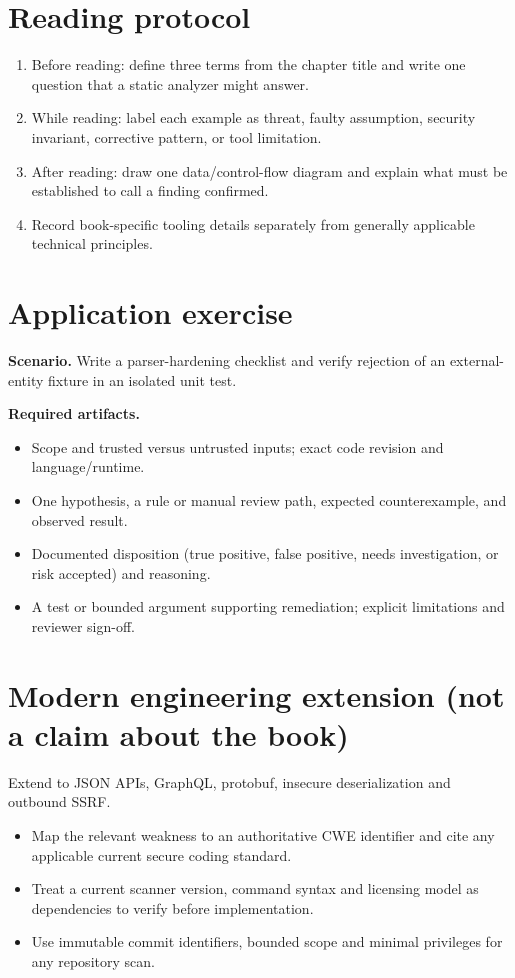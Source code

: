 \documentclass[10pt,letterpaper]{article}
\begin{document}
\section{Reading protocol}
\begin{enumerate}
\item Before reading: define three terms from the chapter title and write one question that a static analyzer might answer.
\item While reading: label each example as threat, faulty assumption, security invariant, corrective pattern, or tool limitation.
\item After reading: draw one data/control-flow diagram and explain what must be established to call a finding confirmed.
\item Record book-specific tooling details separately from generally applicable technical principles.
\end{enumerate}

\section{Application exercise}
\textbf{Scenario.} Write a parser-hardening checklist and verify rejection of an external-entity fixture in an isolated unit test.

\textbf{Required artifacts.}\begin{itemize}
\item Scope and trusted versus untrusted inputs; exact code revision and language/runtime.
\item One hypothesis, a rule or manual review path, expected counterexample, and observed result.
\item Documented disposition (true positive, false positive, needs investigation, or risk accepted) and reasoning.
\item A test or bounded argument supporting remediation; explicit limitations and reviewer sign-off.
\end{itemize}

\section{Modern engineering extension (not a claim about the book)}
Extend to JSON APIs, GraphQL, protobuf, insecure deserialization and outbound SSRF.

\begin{itemize}
\item Map the relevant weakness to an authoritative CWE identifier and cite any applicable current secure coding standard.
\item Treat a current scanner version, command syntax and licensing model as dependencies to verify before implementation.
\item Use immutable commit identifiers, bounded scope and minimal privileges for any repository scan.
\end{itemize}
\end{document}

